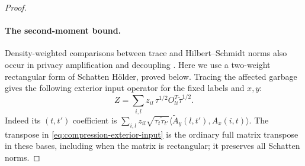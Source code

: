 \documentclass[11pt]{article}
\numberwithin{equation}{section}
\theoremstyle{definition}
\theoremstyle{remark}
\begin{document}
\begin{proof}
\paragraph{The second-moment bound.}
Density-weighted comparisons between trace and Hilbert--Schmidt norms
also occur in privacy amplification and decoupling
\cite[Lemma~5.1.3]{Renner2005Security} \cite[Lemma~3.7]{DupuisBertaWullschlegerRenner2014}.
Here we use a two-weight rectangular form of Schatten H\"older, proved below.
Tracing the affected garbage gives the following exterior input
operator for the fixed labels and $x,y$:
\begin{equation}
 Z=\sum_{i,l}z_{il}\,
          \tau^{1/2}O_{li}^{T}\widetilde\tau^{1/2}.
 \label{eq:compression-exterior-input}
\end{equation}
Indeed its $(t,t')$ coefficient is
$\sum_{i,l}z_{il}\sqrt{\tau_t\widetilde\tau_{t'}}
       \langle\widetilde A_y(l,t'),A_x(i,t)\rangle$.
The transpose in \eqref{eq:compression-exterior-input} is the ordinary
full matrix transpose in these bases, including when the matrix is
rectangular; it preserves all Schatten norms.


\end{proof}
\end{document}
